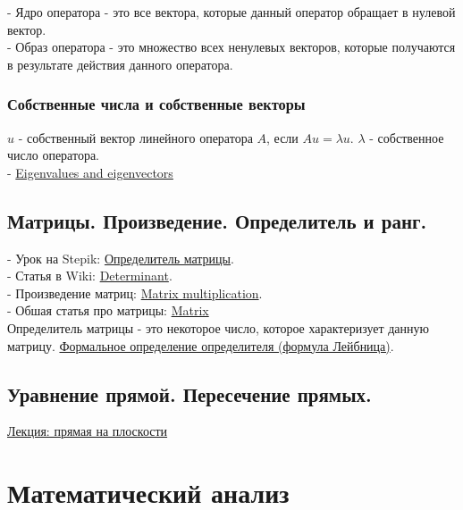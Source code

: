 \documentclass{article}
\begin{document}
- Ядро оператора - это все вектора, которые данный оператор обращает в нулевой вектор. \\
- Образ оператора - это множество всех ненулевых векторов, которые получаются в результате действия данного оператора. \\

\subsubsection{Собственные числа и собственные векторы}

$u$ - собственный вектор линейного оператора $A$, если $Au = \lambda u$. $\lambda$ - собственное число оператора. \\

- \href{https://en.wikipedia.org/wiki/Eigenvalues_and_eigenvectors}{Eigenvalues and eigenvectors}

\subsection{Матрицы. Произведение. Определитель и ранг.}

- Урок на Stepik: \href{https://stepik.org/lesson/44077/step/1?unit=21901}{Определитель матрицы}. \\
- Статья в Wiki: \href{https://en.wikipedia.org/wiki/Determinant}{Determinant}. \\
- Произведение матриц: \href{https://en.wikipedia.org/wiki/Matrix_multiplication}{Matrix multiplication}. \\
- Обшая статья про матрицы: \href{https://en.wikipedia.org/wiki/Matrix_(mathematics)}{Matrix} \\

Определитель матрицы - это некоторое число, которое характеризует данную матрицу. \href{https://en.wikipedia.org/wiki/Leibniz_formula_for_determinants}{Формальное определение определителя (формула Лейбница)}.

\subsection{Уравнение прямой. Пересечение прямых.}

\href{https://portal.tpu.ru/SHARED/p/PEG/page_2/laag/Tab1/LAAG_Lecture-12.pdf}{Лекция: прямая на плоскости}

\section{Математический анализ}
\end{document}
